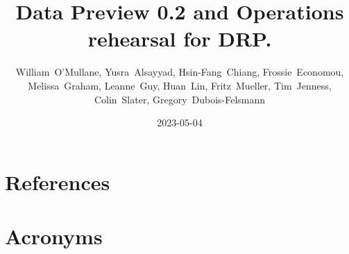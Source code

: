 \documentclass[OPS,authoryear,toc]{lsstdoc}
\title{Data Preview 0.2 and Operations rehearsal for DRP.}
\author{%
William~O'Mullane,
Yusra~Alsayyad,
Hsin-Fang~Chiang,
Frossie~Economou,
Melissa~Graham,
Leanne~Guy,
Huan~Lin,
Fritz~Mueller,
Tim~Jenness,
Colin~Slater,
Gregory~Dubois-Felsmann
}
\date{2023-05-04}
\begin{document}
\maketitle


\appendix
\section{References} \label{sec:bib}
\renewcommand{\refname}{} %


\section{Acronyms} \label{sec:acronyms}

\end{document}
